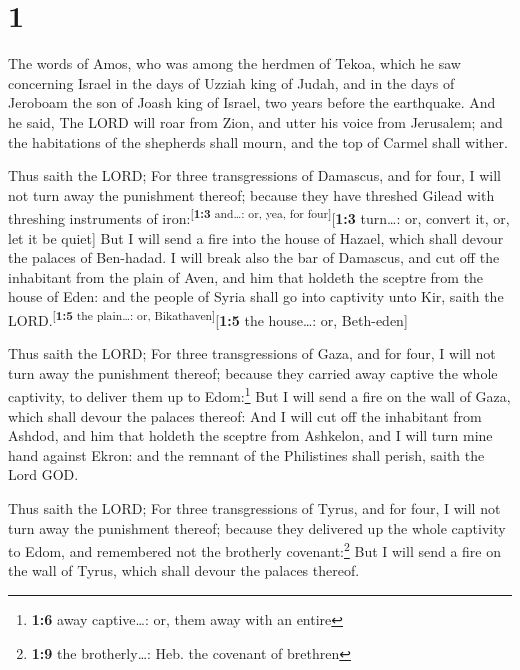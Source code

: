 \hypertarget{section}{%
\section{1}\label{section}}

 The words of Amos, who was among the herdmen of Tekoa,
which he saw concerning Israel in the days of Uzziah king of Judah, and
in the days of Jeroboam the son of Joash king of Israel, two years
before the earthquake.  And he said, The LORD will roar
from Zion, and utter his voice from Jerusalem; and the habitations of
the shepherds shall mourn, and the top of Carmel shall wither.

 Thus saith the LORD; For three transgressions of
Damascus, and for four, I will not turn away the punishment thereof;
because they have threshed Gilead with threshing instruments of
iron:\textsuperscript{{[}\textbf{1:3} and\ldots: or, yea, for
four{]}}{[}\textbf{1:3} turn\ldots: or, convert it, or, let it be
quiet{]}  But I will send a fire into the house of Hazael,
which shall devour the palaces of Ben-hadad.  I will break
also the bar of Damascus, and cut off the inhabitant from the plain of
Aven, and him that holdeth the sceptre from the house of Eden: and the
people of Syria shall go into captivity unto Kir, saith the
LORD.\textsuperscript{{[}\textbf{1:5} the plain\ldots: or,
Bikathaven{]}}{[}\textbf{1:5} the house\ldots: or, Beth-eden{]}

 Thus saith the LORD; For three transgressions of Gaza,
and for four, I will not turn away the punishment thereof; because they
carried away captive the whole captivity, to deliver them up to
Edom:\footnote{\textbf{1:6} away captive\ldots: or, them away with an
  entire}  But I will send a fire on the wall of Gaza,
which shall devour the palaces thereof:  And I will cut
off the inhabitant from Ashdod, and him that holdeth the sceptre from
Ashkelon, and I will turn mine hand against Ekron: and the remnant of
the Philistines shall perish, saith the Lord GOD.

 Thus saith the LORD; For three transgressions of Tyrus,
and for four, I will not turn away the punishment thereof; because they
delivered up the whole captivity to Edom, and remembered not the
brotherly covenant:\footnote{\textbf{1:9} the brotherly\ldots: Heb. the
  covenant of brethren}  But I will send a fire on the
wall of Tyrus, which shall devour the palaces thereof.

